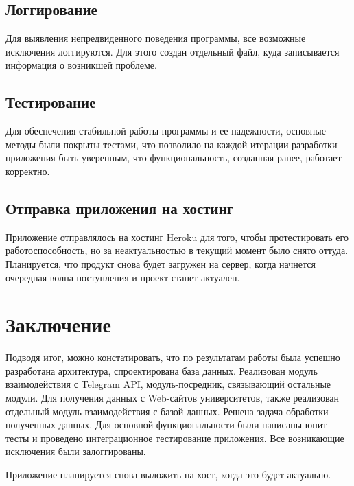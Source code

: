 \documentclass[a4paper,article,14pt]{extarticle}
\begin{document}
\subsection{Логгирование}

Для выявления непредвиденного поведения программы, все возможные исключения логгируются. Для этого создан отдельный файл, куда записывается информация о возникшей проблеме.

\subsection{Тестирование}

Для обеспечения стабильной работы программы и ее надежности, основные методы были покрыты тестами, что позволило на каждой итерации разработки приложения быть уверенным, что функциональность, созданная ранее, работает корректно.

\subsection{Отправка приложения на хостинг}

Приложение отправлялось на хостинг Heroku для того, чтобы протестировать его работоспособность, но за неактуальностью в текущий момент было снято оттуда. Планируется, что продукт снова будет загружен на сервер, когда начнется очередная волна поступления и проект станет актуален.
\pagebreak

\section{Заключение}

Подводя итог, можно констатировать, что по результатам работы была успешно разработана архитектура, спроектирована база данных. Реализован модуль взаимодействия с Telegram API, модуль-посредник, связывающий остальные модули. Для получения данных с Web-сайтов университетов, также реализован отдельный модуль взаимодействия с базой данных. Решена задача обработки полученных данных. Для основной функциональности были написаны юнит-тесты и проведено интеграционное тестирование приложения. Все возникающие исключения были залоггированы. 

Приложение планируется снова выложить на хост, когда это будет актуально.
\pagebreak
\end{document}

